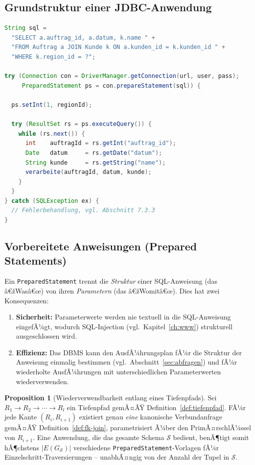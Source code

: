 ﻿\documentclass[a4paper,12pt]{report}
\theoremstyle{definition}
\newtheorem{proposition}[theorem]{Proposition}
\theoremstyle{remark}
\begin{document}
\subsection{Grundstruktur einer JDBC-Anwendung}

\begin{lstlisting}[language=Java]
String sql =
  "SELECT a.auftrag_id, a.datum, k.name " +
  "FROM Auftrag a JOIN Kunde k ON a.kunden_id = k.kunden_id " +
  "WHERE k.region_id = ?";

try (Connection con = DriverManager.getConnection(url, user, pass);
     PreparedStatement ps = con.prepareStatement(sql)) {

  ps.setInt(1, regionId);

  try (ResultSet rs = ps.executeQuery()) {
    while (rs.next()) {
      int    auftragId = rs.getInt("auftrag_id");
      Date   datum     = rs.getDate("datum");
      String kunde     = rs.getString("name");
      verarbeite(auftragId, datum, kunde);
    }
  }
} catch (SQLException ex) {
  // Fehlerbehandlung, vgl. Abschnitt 7.3.3
}
\end{lstlisting}

\subsection{Vorbereitete Anweisungen (Prepared Statements)}
\label{sec:prepared-statements}

Ein \texttt{PreparedStatement} trennt die \emph{Struktur} einer
SQL-Anweisung (das â€žWasâ€œ) von ihren \emph{Parametern} (das â€žWomitâ€œ).
Dies hat zwei Konsequenzen:

\begin{enumerate}
  \item \textbf{Sicherheit:} Parameterwerte werden nie textuell in die
    SQL-Anweisung eingefÃ¼gt, wodurch SQL-Injection (vgl.\
    Kapitel~\ref{ch:www}) strukturell ausgeschlossen wird.
  \item \textbf{Effizienz:} Das DBMS kann den AusfÃ¼hrungsplan fÃ¼r die
    Struktur der Anweisung einmalig bestimmen (vgl.\
    Abschnitt~\ref{sec:abfragen}) und fÃ¼r wiederholte AusfÃ¼hrungen mit
    unterschiedlichen Parameterwerten wiederverwenden.
\end{enumerate}

\begin{proposition}[Wiederverwendbarkeit entlang eines Tiefenpfads]
\label{prop:prepared-pfad}
Sei $R_1 \to R_2 \to \cdots \to R_l$ ein Tiefenpfad gemÃ¤ÃŸ
Definition~\ref{def:tiefenpfad}. FÃ¼r jede Kante $(R_i,R_{i+1})$ existiert
genau \emph{eine} kanonische Verbundanfrage gemÃ¤ÃŸ
Definition~\ref{def:fk-join}, parametrisiert Ã¼ber den PrimÃ¤rschlÃ¼ssel
von $R_{i+1}$. Eine Anwendung, die das gesamte Schema $\mathcal{S}$
bedient, benÃ¶tigt somit hÃ¶chstens $|E(G_{\mathcal{S}})|$ verschiedene
\texttt{PreparedStatement}-Vorlagen fÃ¼r Einzelschritt-Traversierungen --
unabhÃ¤ngig von der Anzahl der Tupel in $\mathcal{S}$.
\end{proposition}
\end{document}
